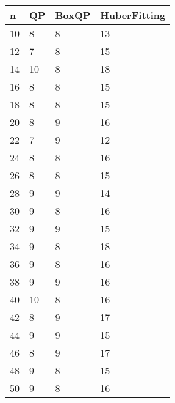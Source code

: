 \begin{tabular}{llll}
n & QP & BoxQP & HuberFitting \\ 
\hline 
10 & 8 & 8 & 13 \\ 
12 & 7 & 8 & 15 \\ 
14 & 10 & 8 & 18 \\ 
16 & 8 & 8 & 15 \\ 
18 & 8 & 8 & 15 \\ 
20 & 8 & 9 & 16 \\ 
22 & 7 & 9 & 12 \\ 
24 & 8 & 8 & 16 \\ 
26 & 8 & 8 & 15 \\ 
28 & 9 & 9 & 14 \\ 
30 & 9 & 8 & 16 \\ 
32 & 9 & 9 & 15 \\ 
34 & 9 & 8 & 18 \\ 
36 & 9 & 8 & 16 \\ 
38 & 9 & 9 & 16 \\ 
40 & 10 & 8 & 16 \\ 
42 & 8 & 9 & 17 \\ 
44 & 9 & 9 & 15 \\ 
46 & 8 & 9 & 17 \\ 
48 & 9 & 8 & 15 \\ 
50 & 9 & 8 & 16 \\ 
\hline 
\end{tabular}